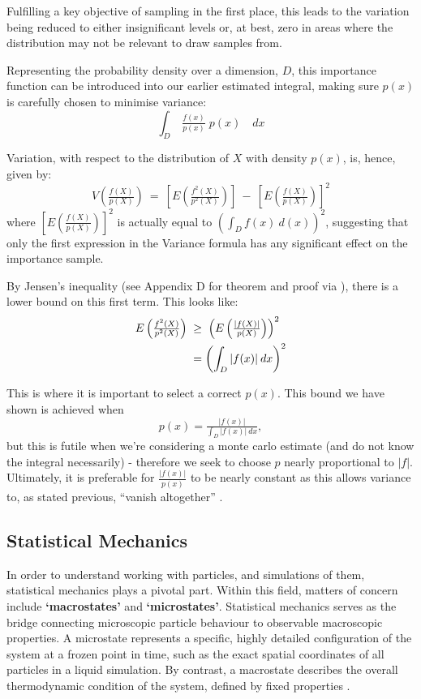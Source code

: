 \documentclass[11pt,a4paper]{article}
\begin{document}
            Fulfilling a key objective of sampling in the first place, this leads to the variation being reduced to either insignificant levels or, at best, zero in areas where the distribution may not be relevant to draw samples from.

            Representing the probability density over a dimension, $D$, this importance function can be introduced into our earlier estimated integral, making sure $p(x)$ is carefully chosen to minimise variance:
            \[
                \int_{D}^{}\:\tfrac{f(x)}{p(x)}\;p(x)\quad dx
            \]

            Variation, with respect to the distribution of $X$ with density $p(x)$, is, hence, given by:
            \[
                V\left(\tfrac{f(X)}{p(X)}\right)\:=\:\left[E\left(\tfrac{f^{2}(X)}{p^{2}(X)}\right)\right]\:-\:\left[E\left(\tfrac{f(X)}{p(X)}\right)\right]^{2}
            \]
            where $\left[E(\tfrac{f(X)}{p(X)})\right]^{2}$ is actually equal to $\left(\int_{D}^{}f(x)\:d(x)\right)^{2}$, suggesting that only the first expression in the Variance formula has any significant effect on the importance sample.
            
            By Jensen's inequality (see Appendix D for theorem and proof via \citep{Wasserman04}), there is a lower bound on this first term.
            This looks like:
            \begin{align}
                E\left(\tfrac{f^{2}(X)}{p^{2}(X)}\right)\; &\geq\; \left(E\left(\tfrac{|f(X)|}{p(X)}\right)\right)^{2} \notag \\
                                           &= \left(\int_{D}^{}|f(x)|\:dx\right)^{2} \notag
            \end{align}

            This is where it is important to select a correct $p(x)$. This bound we have shown is achieved when
            \[
                p(x) = \tfrac{|f(x)|}{\int_{D}^{}|f(x)|\:dx},
            \]
            but this is futile when we're considering a monte carlo estimate (and do not know the integral necessarily) - therefore we seek to choose $p$ nearly proportional to $|f|$.
            Ultimately, it is preferable for $\tfrac{|f(x)|}{p(x)}$ to be nearly constant \citep{Gentle03} as this allows variance to, as stated previous, ``vanish altogether'' \citep{Frenkel96}.
    \subsection{Statistical Mechanics}
        In order to understand working with particles, and simulations of them, statistical mechanics plays a pivotal part.
        Within this field, matters of concern include \textbf{`macrostates'} and \textbf{`microstates'}.
        Statistical mechanics serves as the bridge connecting microscopic particle behaviour to observable macroscopic properties.
        A microstate represents a specific, highly detailed configuration of the system at a frozen point in time, such as the exact spatial coordinates of all particles in a liquid simulation.
        By contrast, a macrostate describes the overall thermodynamic condition of the system, defined by fixed properties \citep{Greiner95}.
\end{document}
